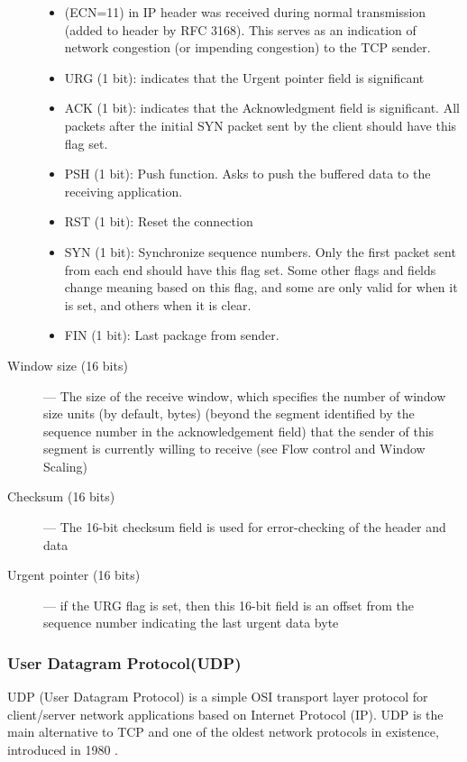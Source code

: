 \documentclass[12pt]{article}
\theoremstyle{definition}
\begin{document}
\begin{description}
\begin{itemize}
					\item (ECN=11) in IP header was received during normal transmission (added to header by RFC 3168). This serves as an indication of network congestion (or impending congestion) to the TCP sender.
					
					\item URG (1 bit): indicates that the Urgent pointer field is significant
					\item ACK (1 bit): indicates that the Acknowledgment field is significant. All packets after the initial SYN packet sent by the client should have this flag set.
					\item PSH (1 bit): Push function. Asks to push the buffered data to the receiving application.
					\item RST (1 bit): Reset the connection
					\item SYN (1 bit): Synchronize sequence numbers. Only the first packet sent from each end should have this flag set. Some other flags and fields change meaning based on this flag, and some are only valid for when it is set, and others when it is clear.
					\item FIN (1 bit): Last package from sender.
				\end{itemize}
				
				\item [Window size (16 bits)] ---
				The size of the receive window, which specifies the number of window size units (by default, bytes) (beyond the segment identified by the sequence number in the acknowledgement field) that the sender of this segment is currently willing to receive (see Flow control and Window Scaling)
				\item [Checksum (16 bits)] ---
				The 16-bit checksum field is used for error-checking of the header and data
				\item [Urgent pointer (16 bits)] ---
				if the URG flag is set, then this 16-bit field is an offset from the sequence number indicating the last urgent data byte
				
			\end{description}
			
			\subsubsection{User Datagram Protocol(UDP)}
			UDP (User Datagram Protocol) is a simple OSI transport layer protocol for client/server network applications based on Internet Protocol (IP). UDP is the main alternative to TCP and one of the oldest network protocols in existence, introduced in 1980 \cite{Ahn2017}.
			
\end{document}
